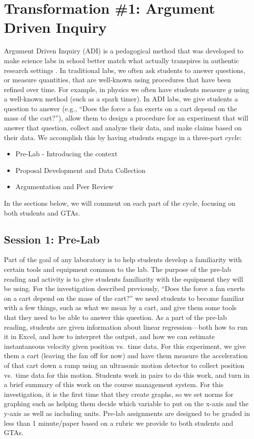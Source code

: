 \documentclass[aip, numerical, preprint]{revtex4-2}
\begin{document}
\section{Transformation \#1: Argument Driven Inquiry}
Argument Driven Inquiry (ADI) is a pedagogical method that was developed to make science labs
in school better match what actually transpires in authentic research settings
\citep{Walker2011,Sampson2011,Walker2016}.  In traditional labs, we often ask students to
answer questions, or measure quantities, that are well-known using procedures that have been
refined over time.  For example, in physics we often have students measure $g$ using a
well-known method (such as a spark timer).  In ADI labs, we give students a question to answer
(e.g., ``Does the force a fan exerts on a cart depend on the mass of the cart?''), allow them
to design a procedure for an experiment that will answer that question, collect and analyze
their data, and make claims based on their data.  We accomplish this by having students engage
in a three-part cycle:
\begin{itemize}
  \item Pre-Lab - Introducing the context
  \item Proposal Development and Data Collection
  \item Argumentation and Peer Review
\end{itemize}
In the sections below, we will comment on each part of the cycle, focusing on both students and
GTAs.

\subsection{Session 1: Pre-Lab}
Part of the goal of any laboratory is to help students develop a familiarity with certain tools
and equipment common to the lab.  The purpose of the pre-lab reading and activity is to give
students familiarity with the equipment they will be using.  For the investigation described
previously, ``Does the force a fan exerts on a cart depend on the mass of the cart?''  we need
students to become familiar with a few things, such as what we mean by a cart, and give them
some tools that they need to be able to answer this question.  As a part of the pre-lab
reading, students are given information about linear regression---both how to run it in Excel,
and how to interpret the output, and how we can estimate instantaneous velocity given position
vs.\ time data. For this experiment, we give them a cart (leaving the fan off for now) and have
them measure the acceleration of that cart down a ramp using an ultrasonic motion detector to
collect position vs.\ time data for this motion.  Students work in pairs to do this work, and
turn in a brief summary of this work on the course management system.  For this investigation,
it is the first time that they create graphs, so we set norms for graphing such as helping them
decide which variable to put on the x-axis and the y-axis as well as including units.  Pre-lab
assignments are designed to be graded in less than 1 minute/paper based on a rubric we provide
to both students and GTAs.
\end{document}
